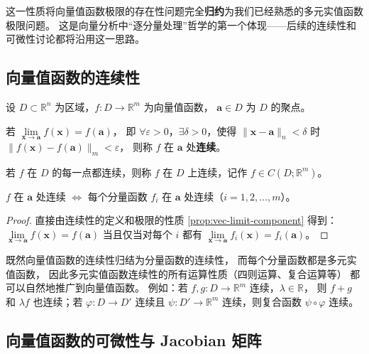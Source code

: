 \documentclass[lang=cn,11pt]{elegantbook}
\begin{document}
\begin{remark}[分量等价性的意义]
这一性质将向量值函数极限的存在性问题完全\textbf{归约}为我们已经熟悉的多元实值函数极限问题。
这是向量分析中“逐分量处理”哲学的第一个体现——后续的连续性和可微性讨论都将沿用这一思路。
\end{remark}


\subsection{向量值函数的连续性}

\begin{definition}[向量值函数的连续性] \label{def:vec-continuity}
设 $D\subset\mathbb R^n$ 为区域，$f:D\to\mathbb R^m$ 为向量值函数，
$\boldsymbol a\in D$ 为 $D$ 的聚点。

若 $\lim\limits_{\boldsymbol x\to\boldsymbol a}f(\boldsymbol x)=f(\boldsymbol a)$，
即 $\forall\varepsilon>0$，$\exists\delta>0$，使得 $\|\boldsymbol x-\boldsymbol a\|_n<\delta$ 时
$\|f(\boldsymbol x)-f(\boldsymbol a)\|_m<\varepsilon$，
则称 $f$ 在 $\boldsymbol a$ 处\textbf{连续}。

若 $f$ 在 $D$ 的每一点都连续，则称 $f$ 在 $D$ 上连续，记作 $f\in C(D;\mathbb R^m)$。
\end{definition}

\begin{property}[连续性的分量等价性] \label{prop:vec-cont-component}
$f$ 在 $\boldsymbol a$ 处连续 $\Longleftrightarrow$
每个分量函数 $f_i$ 在 $\boldsymbol a$ 处连续（$i=1,2,\dots,m$）。
\end{property}

\begin{proof}
直接由连续性的定义和极限的性质 \ref{prop:vec-limit-component} 得到：
$\lim\limits_{\boldsymbol x\to\boldsymbol a}f(\boldsymbol x)=f(\boldsymbol a)$
当且仅当对每个 $i$ 都有
$\lim\limits_{\boldsymbol x\to\boldsymbol a}f_i(\boldsymbol x)=f_i(\boldsymbol a)$。
\end{proof}

\begin{note}[连续的运算封闭性]
既然向量值函数的连续性归结为分量函数的连续性，
而每个分量函数都是多元实值函数，
因此多元实值函数连续性的所有运算性质（四则运算、复合运算等）
都可以自然地推广到向量值函数。
例如：若 $f,g:D\to\mathbb R^m$ 连续，$\lambda\in\mathbb R$，
则 $f+g$ 和 $\lambda f$ 也连续；若 $\varphi:D\to D'$ 连续且
$\psi:D'\to\mathbb R^m$ 连续，则复合函数 $\psi\circ\varphi$ 连续。
\end{note}


\subsection{向量值函数的可微性与 Jacobian 矩阵}
\end{document}
